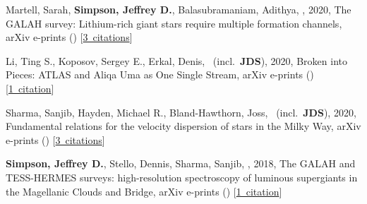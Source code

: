 \item[{\color{numcolor}\scriptsize4}] Martell, Sarah, \textbf{Simpson, Jeffrey D.}, Balasubramaniam, Adithya, \etal, 2020, The GALAH survey: Lithium-rich giant stars require multiple formation channels, arXiv e-prints () [\href{https://ui.adsabs.harvard.edu/#abs/2020arXiv200602106M}{3~citations}]

\item[{\color{numcolor}\scriptsize3}] Li, Ting S., Koposov, Sergey E., Erkal, Denis, \etal\ (incl.\ \textbf{JDS}), 2020, Broken into Pieces: ATLAS and Aliqa Uma as One Single Stream, arXiv e-prints () [\href{https://ui.adsabs.harvard.edu/#abs/2020arXiv200610763L}{1~citation}]

\item[{\color{numcolor}\scriptsize2}] Sharma, Sanjib, Hayden, Michael R., Bland-Hawthorn, Joss, \etal\ (incl.\ \textbf{JDS}), 2020, Fundamental relations for the velocity dispersion of stars in the Milky Way, arXiv e-prints () [\href{https://ui.adsabs.harvard.edu/#abs/2020arXiv200406556S}{3~citations}]

\item[{\color{numcolor}\scriptsize1}] \textbf{Simpson, Jeffrey D.}, Stello, Dennis, Sharma, Sanjib, \etal, 2018, The GALAH and TESS-HERMES surveys: high-resolution spectroscopy of luminous supergiants in the Magellanic Clouds and Bridge, arXiv e-prints () [\href{https://ui.adsabs.harvard.edu/#abs/2018arXiv180405900S}{1~citation}]
